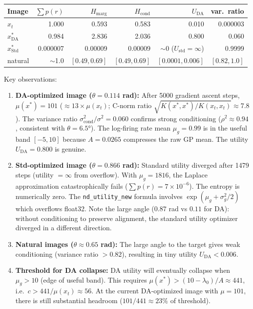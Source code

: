 \documentclass[11pt]{article}
\begin{document}
\begin{center}
\begin{tabular}{lrrrrr}
\hline
Image & $\sum p(r)$ & $H_{\text{marg}}$ & $H_{\text{cond}}$ & $U_{\text{DA}}$ & var.\ ratio \\
\hline
$x_t$ & 1.000 & 0.593 & 0.583 & 0.010 & 0.000003 \\
$x^*_{\text{DA}}$ & 0.984 & 2.836 & 2.036 & 0.800 & 0.060 \\
$x^*_{\text{Std}}$ & 0.000007 & 0.00009 & 0.00009 & $\sim$0 ($U_{\text{std}} = \infty$) & 0.9999 \\
natural & $\sim$1.0 & $[0.49, 0.69]$ & $[0.49, 0.69]$ & $[0.0001, 0.006]$ & $[0.82, 1.0]$ \\
\hline
\end{tabular}
\end{center}

Key observations:
\begin{enumerate}
    \item \textbf{DA-optimized image ($\theta = 0.114$ rad):}
    After 5000 gradient ascent steps, $\mu(x^*) = 101$
    ($\approx 13 \times \mu(x_t)$; C-norm ratio $\sqrt{K(x^*,x^*)/K(x_t,x_t)} \approx 7.8$).
    The variance ratio $\sigma^2_{\text{cond}}/\sigma^2 = 0.060$ confirms
    strong conditioning ($\rho^2 \approx 0.94$, consistent with $\theta = 6.5°$).
    The log-firing rate mean $\mu_g = 0.99$ is in the useful band
    $[-5, 10]$ because $A = 0.0265$ compresses the raw GP mean.
    The utility $U_{\text{DA}} = 0.800$ is genuine.

    \item \textbf{Std-optimized image ($\theta = 0.866$ rad):}
    Standard utility diverged after 1479 steps (utility $= \infty$ from overflow).
    With $\mu_g = 1816$, the Laplace approximation catastrophically fails
    ($\sum p(r) = 7 \times 10^{-6}$). The entropy is numerically zero.
    The \texttt{nd\_utility\_new} formula involves $\exp(\mu_g + \sigma^2_g/2)$
    which overflows float32. Note the large angle ($0.87$ rad vs $0.11$ for DA):
    without conditioning to preserve alignment, the standard utility optimizer
    diverged in a different direction.

    \item \textbf{Natural images ($\theta \approx 0.65$ rad):}
    The large angle to the target gives weak conditioning (variance ratio $> 0.82$),
    resulting in tiny utility $U_{\text{DA}} < 0.006$.

    \item \textbf{Threshold for DA collapse:}
    DA utility will eventually collapse when $\mu_g > 10$ (edge of useful band).
    This requires $\mu(x^*) > (10 - \lambda_0)/A \approx 441$, i.e.\
    $c > 441/\mu(x_t) \approx 56$.
    At the current DA-optimized image with $\mu = 101$, there is
    still substantial headroom ($101/441 \approx 23\%$ of threshold).
\end{enumerate}
\end{document}
